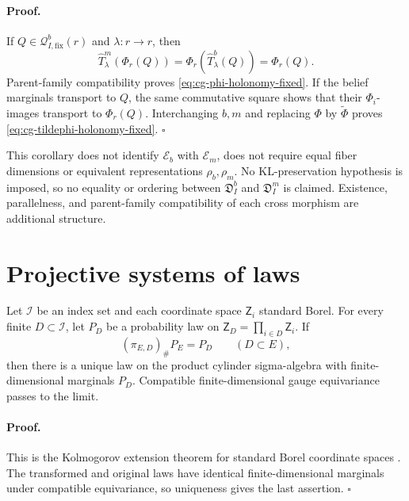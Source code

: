 \paragraph{Proof.}
If \(Q\in\mathscr Q_{I,\mathrm{fix}}^b(r)\) and \(\lambda:r\to r\), then
\begin{equation}
\widehat T_\lambda^m(\Phi_r(Q))
=\Phi_r(\widehat T_\lambda^b(Q))
=\Phi_r(Q).
\label{eq:cg-phi-loop-fixed}
\end{equation}
Parent-family compatibility proves \eqref{eq:cg-phi-holonomy-fixed}. If the
belief marginals transport to \(Q\), the same commutative square shows that
their \(\Phi_i\)-images transport to \(\Phi_r(Q)\). Interchanging \(b,m\)
and replacing \(\Phi\) by \(\widetilde\Phi\) proves
\eqref{eq:cg-tildephi-holonomy-fixed}. \(\square\)

This corollary does not identify \(\mathcal E_b\) with \(\mathcal E_m\),
does not require equal fiber dimensions or equivalent representations
\(\rho_b,\rho_m\). No KL-preservation hypothesis is imposed, so no equality
or ordering between \(\mathfrak D_I^b\) and \(\mathfrak D_I^m\) is claimed.
Existence, parallelness, and parent-family compatibility of each cross
morphism are additional structure. 

\section{Projective systems of laws}
\label{sec:cg-projective-laws}

Let \(\mathcal I\) be an index set and each coordinate space
\(\mathsf Z_i\) standard Borel. For every finite \(D\subset\mathcal I\), let
\(P_D\) be a probability law on \(\mathsf Z_D=\prod_{i\in D}\mathsf Z_i\).
If
\begin{equation}
(\pi_{E,D})_\#P_E=P_D\qquad(D\subset E),
\label{eq:cg-projective-consistency}
\end{equation}
then there is a unique law on the product cylinder sigma-algebra with
finite-dimensional marginals \(P_D\). Compatible finite-dimensional gauge
equivariance passes to the limit. 

\paragraph{Proof.}
This is the Kolmogorov extension theorem for standard Borel coordinate spaces
\citep{Kallenberg2021}. The transformed and original laws have identical
finite-dimensional marginals under compatible equivariance, so uniqueness
gives the last assertion. \(\square\)

